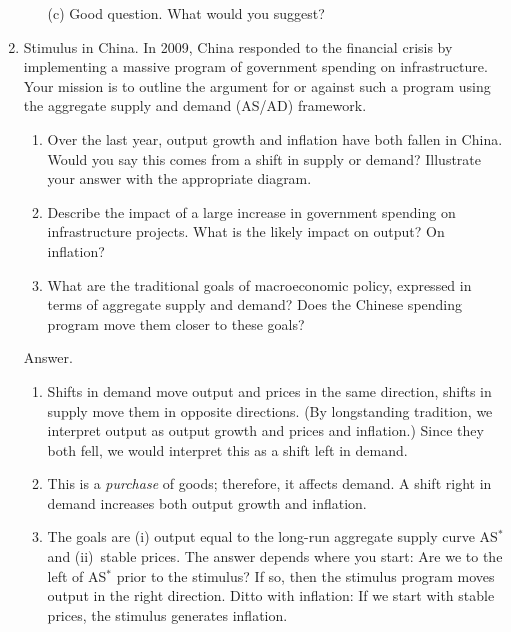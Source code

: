 \begin{enumerate}
\begin{enumerate}
\item[(c)] Good question.  What would you suggest?
\end{enumerate}

\item Stimulus in China.
In 2009, China responded to the financial crisis by
implementing a massive program of government spending
on infrastructure.
Your mission is to outline the argument for or against such a program
using the aggregate supply
 and demand (AS/AD) framework.
%
\begin{enumerate}

\item Over the last year, output growth and inflation have both fallen in China.  Would you say this comes from a shift in supply or demand?
    Illustrate your answer with the appropriate diagram.

\item Describe the impact of
a large increase in government spending on infrastructure projects.
What is the likely impact on output?  On inflation?

\item What are the traditional goals of macroeconomic policy,
expressed in terms of aggregate supply
 and demand?
Does the Chinese spending program move them closer to these goals?
\end{enumerate}

Answer.
\begin{enumerate}
\item Shifts in demand move output and prices in the same direction,
shifts in supply move them in opposite directions.
(By longstanding tradition, we interpret output as output growth
and prices and inflation.)
Since they both fell, we would interpret this as a shift left in demand.

\item This is a {\it purchase\/} of goods; therefore, it affects demand.
A shift right in demand increases both output growth and inflation.

\item The goals are (i) output equal to the   long-run aggregate supply 
 curve AS$^*$ and (ii)~stable prices.
    The answer depends where you start:  Are we to the left of AS$^*$ prior to the stimulus?  If so, then the stimulus program moves
output in the right direction.
Ditto with inflation:  If we start with stable prices,
the stimulus generates inflation.
\end{enumerate}


\end{enumerate}
